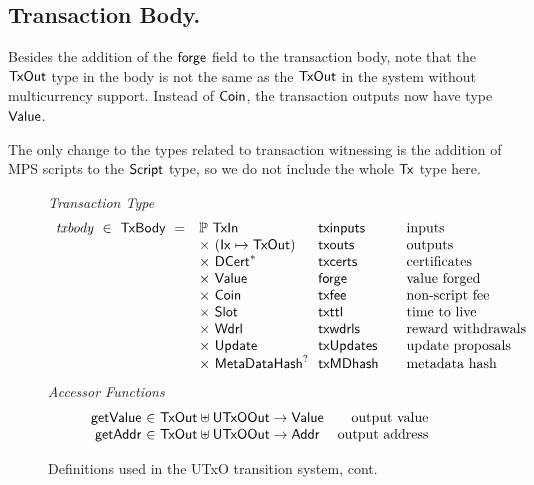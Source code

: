 \subsection*{Transaction Body.}

Besides the addition of the $\mathsf{forge}$ field to the transaction body,
note that the $\mathsf{TxOut}$ type in the body is not the same as
the $\mathsf{TxOut}$ in the system without multicurrency support. Instead of
$\mathsf{Coin}$, the transaction outputs now have type $\mathsf{Value}$.

The only change to the types related to transaction witnessing is the addition
of MPS scripts to the $\mathsf{Script}$ type, so we do not include the whole $\mathsf{Tx}$ type here.

\begin{figure*}[htb]
  \emph{Transaction Type}
  \begin{equation*}
    \begin{array}{r@{~~}l@{~~}l@{\qquad}l}
      \var{txbody} ~\in~ \TxBody ~=~
      & \powerset{\TxIn} & \fun{txinputs}& \text{inputs}\\
      &\times ~(\Ix \mapsto \TxOut) & \fun{txouts}& \text{outputs}\\
      & \times~ \seqof{\DCert} & \fun{txcerts}& \text{certificates}\\
       & \times ~\Value  & \fun{forge} &\text{value forged}\\
       & \times ~\Coin & \fun{txfee} &\text{non-script fee}\\
       & \times ~\Slot & \fun{txttl} & \text{time to live}\\
       & \times~ \Wdrl  & \fun{txwdrls} &\text{reward withdrawals}\\
       & \times ~\Update  & \fun{txUpdates} & \text{update proposals}\\
       & \times ~\MetaDataHash^? & \fun{txMDhash} & \text{metadata hash}\\
    \end{array}
  \end{equation*}
  \emph{Accessor Functions}
  \begin{equation*}
    \begin{array}{r@{~\in~}lr}
      \fun{getValue} & \TxOut \uniondistinct \UTxOOut \to \Value & \text{output value} \\
      \fun{getAddr} & \TxOut \uniondistinct \UTxOOut \to \Addr & \text{output address} \\
    \end{array}
  \end{equation*}
  \caption{Definitions used in the UTxO transition system, cont.}
  \label{fig:defs:utxo-shelley-2}
\end{figure*}

